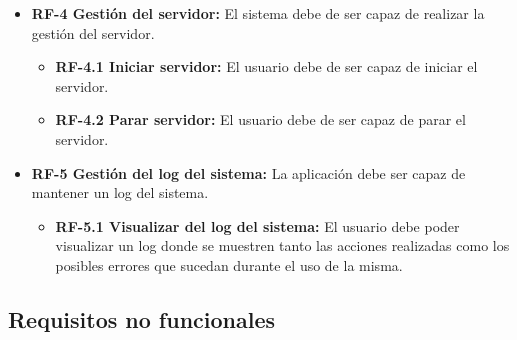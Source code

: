 \begin{itemize}
	\item
		\textbf{RF-4 Gestión del servidor:} 
			El sistema debe de ser capaz de realizar la gestión del servidor.
		\begin{itemize}
			\item
				\textbf{RF-4.1 Iniciar servidor:}
					El usuario debe de ser capaz de iniciar el servidor.
			\item \label{RF4-2}
				\textbf{RF-4.2 Parar servidor:}
					El usuario debe de ser capaz de parar el servidor.
		\end{itemize}
	\item
		\textbf{RF-5 Gestión del log del sistema:} 
			La aplicación debe ser capaz de mantener un log del sistema.
			\begin{itemize}
			\item
				\textbf{RF-5.1 Visualizar del log del sistema:}
					El usuario debe poder visualizar un log donde se muestren tanto las acciones realizadas como los posibles errores que sucedan durante el uso de la misma.
		\end{itemize}
\end{itemize}



\subsection{Requisitos no funcionales}


